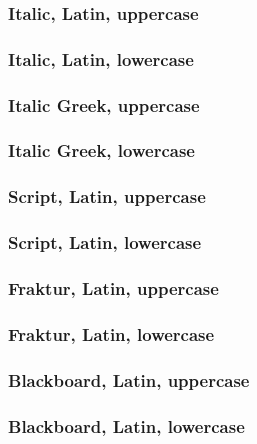 \documentclass[a4paper,final]{article}
\begin{document}
\subsubsection{Italic, Latin, uppercase}

\subsubsection{Italic, Latin, lowercase}

\subsubsection{Italic Greek, uppercase}

\subsubsection{Italic Greek, lowercase}

\subsubsection{Script, Latin, uppercase}

\subsubsection{Script, Latin, lowercase}

\subsubsection{Fraktur, Latin, uppercase}

\subsubsection{Fraktur, Latin, lowercase}

\subsubsection{Blackboard, Latin, uppercase}

\subsubsection{Blackboard, Latin, lowercase}
\end{document}
